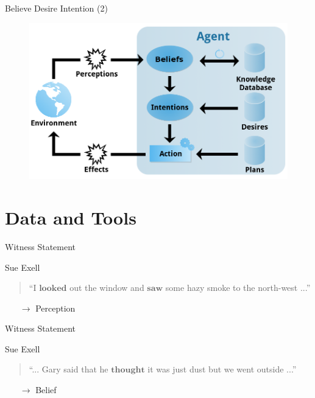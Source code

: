 \documentclass{beamer}
\begin{document}
    \begin{frame}{Believe Desire Intention (2)}
      \vspace{-2em}
      \begin{figure}[h]
        \includegraphics[scale=0.35]{bdi_graph.png}
      \end{figure}
    \end{frame}

  \section{Data and Tools}

    \begin{frame}{Witness Statement \cite{exell}}
      \begin{block}{Sue Exell}
        \begin{quote}
  				\textquotedblleft I $\textbf{looked}$ out the window and $\textbf{saw}$ some hazy smoke to the north-west ...\textquotedblright
        \end{quote}
      \end{block}
      \begin{itemize}
        \item[$\rightarrow$] Perception
      \end{itemize}
    \end{frame}

    \begin{frame}{Witness Statement \cite{exell}}
      \begin{block}{Sue Exell}
        \begin{quote}
  				\textquotedblleft ... Gary said that he $\textbf{thought}$ it was just dust but we went outside ...\textquotedblright
  			\end{quote}
      \end{block}
      \begin{itemize}
        \item[$\rightarrow$] Belief
      \end{itemize}
    \end{frame}
\end{document}
